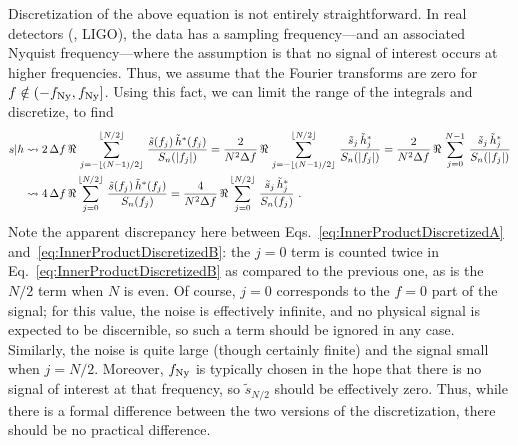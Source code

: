 \documentclass[aps, prd, amsfonts, amssymb, amsmath, %
nofootinbib]{revtex4}
\begin{document}
Discretization of the above equation is not entirely straightforward.
In real detectors (\eg, LIGO), the data has a sampling frequency---and
an associated Nyquist frequency---where the assumption is that no
signal of interest occurs at higher frequencies.  Thus, we assume that
the Fourier transforms are zero for $f \notin (-f_{\mathrm{Ny}}, f_{\mathrm{Ny}}]$.  Using
this fact, we can limit the range of the integrals and discretize, to
find
\begin{subequations}
  \label{eq:InnerProductDiscretized}
  \begin{align}
    \label{eq:InnerProductDiscretizedA}
    \InnerProduct{s|h} &\discretize 2\, \Delta f\, \Re\,
    \sum_{j=-\floor{(N-1)/2}}^{\floor{N/2}}\, \frac{\tilde{s}(f_{j})\,
      \tilde{h}^{\ast}(f_{j})}{S_{n}(\abs{f_{j}})} = \frac{2}{N^{2}
      \Delta f}\, \Re\, \sum_{j=-\floor{(N-1)/2}}^{\floor{N/2}}\,
    \frac{\tilde{s}_{j}\, \tilde{h}^{\ast}_{j}}{S_{n}(\abs{f_{j}})} =
    \frac{2}{N^{2} \Delta f}\, \Re\, \sum_{j=0}^{N-1}\,
    \frac{\tilde{s}_{j}\, \tilde{h}^{\ast}_{j}}{S_{n}(\abs{f_{j}})}
    \\
    \label{eq:InnerProductDiscretizedB}
    &\discretize 4\, \Delta f\, \Re \sum_{j=0}^{\floor{N/2}}\,
    \frac{\tilde{s}(f_{j})\, \tilde{h}^{\ast}(f_{j})} {S_{n}(f_{j})} =
    \frac{4}{N^{2} \Delta f}\, \Re \sum_{j=0}^{\floor{N/2}}\,
    \frac{\tilde{s}_{j}\, \tilde{h}^{\ast}_{j}} {S_{n}(f_{j})}\ .
  \end{align}
\end{subequations}
Note the apparent discrepancy here between
Eqs.~\eqref{eq:InnerProductDiscretizedA}
and~\eqref{eq:InnerProductDiscretizedB}: the $j=0$ term is counted
twice in Eq.~\eqref{eq:InnerProductDiscretizedB} as compared to the
previous one, as is the $N/2$ term when $N$ is even.  Of course, $j=0$
corresponds to the $f=0$ part of the signal; for this value, the noise
is effectively infinite, and no physical signal is expected to be
discernible, so such a term should be ignored in any case.  Similarly,
the noise is quite large (though certainly finite) and the signal
small when $j=N/2$.  Moreover, $f_{\mathrm{Ny}}$ is typically chosen in the hope
that there is no signal of interest at that frequency, so
$\tilde{s}_{N/2}$ should be effectively zero.  Thus, while there is a
formal difference between the two versions of the discretization,
there should be no practical difference.
\end{document}
